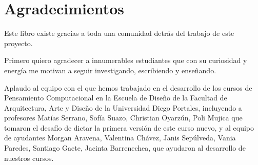 \documentclass[../principal.tex]{subfiles}
\begin{document}
\chapter{Agradecimientos}

Este libro existe gracias a toda una comunidad detrás del trabajo de este proyecto.

Primero quiero agradecer a innumerables estudiantes que con su curiosidad y energía me motivan a seguir investigando, escribiendo y enseñando.

Aplaudo al equipo con el que hemos trabajado en el desarrollo de los cursos de Pensamiento Computacional en la Escuela de Diseño de la Facultad de Arquitectura, Arte y Diseño de la Universidad Diego Portales, incluyendo  a profesores Matías Serrano, Sofía Suazo, Christian Oyarzún, Poli Mujica que tomaron el desafío de dictar la primera versión de este curso nuevo, y al equipo de ayudantes Morgan Aravena, Valentina Chávez, Janis Sepúlveda, Vania Paredes, Santiago Gaete, Jacinta Barrenechea, que ayudaron al desarrollo de nuestros cursos.






\newpage
\end{document}
